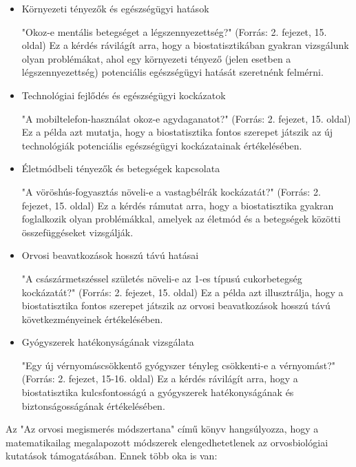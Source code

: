 \documentclass[a4paper,12pt]{article}
\begin{document}
\begin{itemize}
\item Környezeti tényezők és egészségügyi hatások

"Okoz-e mentális betegséget a légszennyezettség?" (Forrás: 2. fejezet, 15. oldal) Ez a kérdés rávilágít arra, hogy a biostatisztikában gyakran vizsgálunk olyan problémákat, ahol egy környezeti tényező (jelen esetben a légszennyezettség) potenciális egészségügyi hatását szeretnénk felmérni.

\item Technológiai fejlődés és egészségügyi kockázatok

"A mobiltelefon-használat okoz-e agydaganatot?" (Forrás: 2. fejezet, 15. oldal) Ez a példa azt mutatja, hogy a biostatisztika fontos szerepet játszik az új technológiák potenciális egészségügyi kockázatainak értékelésében.

\item Életmódbeli tényezők és betegségek kapcsolata 

"A vöröshús-fogyasztás növeli-e a vastagbélrák kockázatát?" (Forrás: 2. fejezet, 15. oldal) Ez a kérdés rámutat arra, hogy a biostatisztika gyakran foglalkozik olyan problémákkal, amelyek az életmód és a betegségek közötti összefüggéseket vizsgálják.

\item Orvosi beavatkozások hosszú távú hatásai

"A császármetszéssel születés növeli-e az 1-es típusú cukorbetegség kockázatát?" (Forrás: 2. fejezet, 15. oldal) Ez a példa azt illusztrálja, hogy a biostatisztika fontos szerepet játszik az orvosi beavatkozások hosszú távú következményeinek értékelésében.


\item Gyógyszerek hatékonyságának vizsgálata

"Egy új vérnyomáscsökkentő gyógyszer tényleg csökkenti-e a vérnyomást?" (Forrás: 2. fejezet, 15-16. oldal) Ez a kérdés rávilágít arra, hogy a biostatisztika kulcsfontosságú a gyógyszerek hatékonyságának és biztonságosságának értékelésében.

\end{itemize}

Az "Az orvosi megismerés módszertana" című könyv hangsúlyozza, hogy a matematikailag megalapozott módszerek elengedhetetlenek az orvosbiológiai kutatások támogatásában. Ennek több oka is van:
\end{document}
